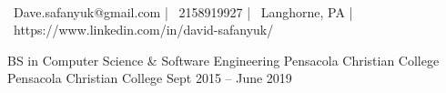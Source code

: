 \documentclass[]{awesome-cv}
\begin{document}
    
\begin{center}
	  \\
	\vspace{2mm}
	{\faEnvelope\ Dave.safanyuk@gmail.com} | {\faMobile\ 2158919927} | {\faMapMarker\ Langhorne, PA} | {\faLink\ https://www.linkedin.com/in/david-safanyuk/}
\end{center}
\begin{cventries}
	\cventry
	{BS in Computer Science \& Software Engineering}
	{Pensacola Christian College}
	{Pensacola Christian College}
	{Sept 2015 – June 2019}
	{}
\end{cventries}
\end{document}
